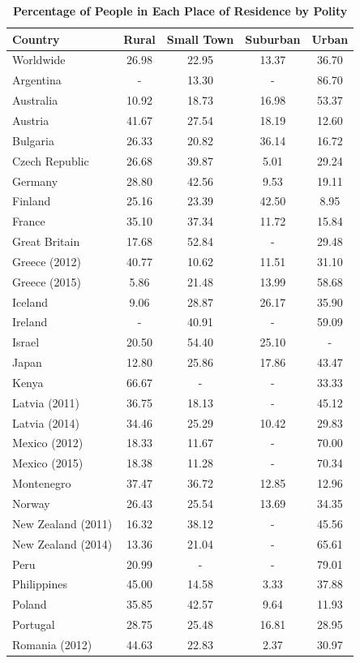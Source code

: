 \documentclass[12pt, titlepage]{article}
\newcommand\tb{\textbf}
\begin{document}
\begin{table}[h!]
	\centering
	\caption{\tb{Percentage of People in Each Place of Residence by Polity}}
	\begin{tabulary}{\linewidth}{l c c c c}
		\hline
		\tb{Country}&\tb{Rural}&\tb{Small Town}&\tb{Suburban}&\tb{Urban}\\
		\hline
		Worldwide&26.98&22.95&13.37&36.70 \\
		Argentina&-&13.30&-&86.70 \\
		Australia&10.92&18.73&16.98&53.37 \\
		Austria&41.67&27.54&18.19&12.60 \\
		Bulgaria&26.33&20.82&36.14&16.72 \\
		Czech Republic&26.68&39.87&5.01&29.24 \\
		Germany&28.80&42.56&9.53&19.11 \\
		Finland&25.16&23.39&42.50&8.95 \\
		France&35.10&37.34&11.72&15.84 \\
		Great Britain&17.68&52.84&-&29.48 \\
		Greece (2012)&40.77&10.62&11.51&31.10 \\
		Greece (2015)&5.86&21.48&13.99&58.68 \\
		Iceland&9.06&28.87&26.17&35.90 \\
		Ireland&-&40.91&-&59.09 \\
		Israel&20.50&54.40&25.10&- \\
		Japan&12.80&25.86&17.86&43.47 \\
		Kenya&66.67&-&-&33.33 \\
		Latvia (2011)&36.75&18.13&-&45.12 \\
		Latvia (2014)&34.46&25.29&10.42&29.83 \\
		Mexico (2012)&18.33&11.67&-&70.00 \\
		Mexico (2015)&18.38&11.28&-&70.34 \\
		Montenegro&37.47&36.72&12.85&12.96 \\
		Norway&26.43&25.54&13.69&34.35 \\
		New Zealand (2011)&16.32&38.12&-&45.56 \\
		New Zealand (2014)&13.36&21.04&-&65.61 \\
		Peru&20.99&-&-&79.01 \\
		Philippines&45.00&14.58&3.33&37.88 \\
		Poland&35.85&42.57&9.64&11.93 \\
		Portugal&28.75&25.48&16.81&28.95 \\
		Romania (2012)&44.63&22.83&2.37&30.97 \\

\end{tabulary}
\end{table}
\end{document}
